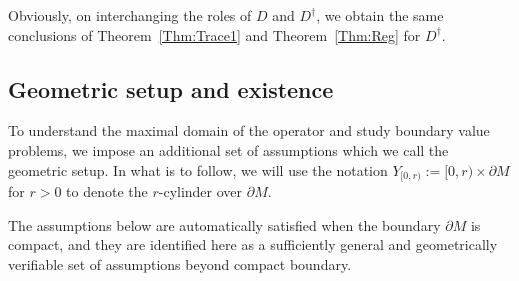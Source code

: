 \documentclass[a4paper,10pt,reqno]{amsart}
\newcommand{\dM}{\partial M}
\theoremstyle{definition}
\begin{document}
Obviously, on interchanging the roles of $D$ and $D^\dagger$, we obtain the same conclusions of Theorem~\ref{Thm:Trace1} and  Theorem~\ref{Thm:Reg} for $D^\dagger$.

\subsection{Geometric setup and existence}
\label{subsec:GeometricSetup}

To understand the maximal domain of the operator and study boundary value problems, we impose an additional set of assumptions which we call the geometric setup.
In what is to follow, we will  use the notation $Y_{[0,r)} := [0,r) \times \dM$ for $r > 0$ to denote the $r$-cylinder over $\dM$.

The assumptions below are automatically satisfied when the boundary $\dM$ is compact, and they are identified here as a sufficiently general and geometrically verifiable set of assumptions beyond compact boundary.
\end{document}
